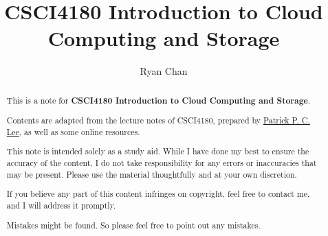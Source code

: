 \documentclass[a4paper]{report}
\author{Ryan Chan}
\title{CSCI4180 Introduction to Cloud Computing and Storage}
\begin{document}
\setlength\parindent{0pt}

\maketitle

\newpage

\begin{abstract}
	This is a note for \textbf{CSCI4180 Introduction to Cloud Computing and Storage}. 
	
	Contents are adapted from the lecture notes of CSCI4180, prepared by \href{https://www.cse.cuhk.edu.hk/~pclee/}{Patrick P. C. Lee}, as well as some online resources.
	
	This note is intended solely as a study aid. While I have done my best to ensure the accuracy of the content, I do not take responsibility for any errors or inaccuracies that may be present. Please use the material thoughtfully and at your own discretion.
	
	If you believe any part of this content infringes on copyright, feel free to contact me, and I will address it promptly.
	
	Mistakes might be found. So please feel free to point out any mistakes.
\end{abstract}

\newpage

\tableofcontents

\setlength{\parskip}{5pt}
\end{document}
